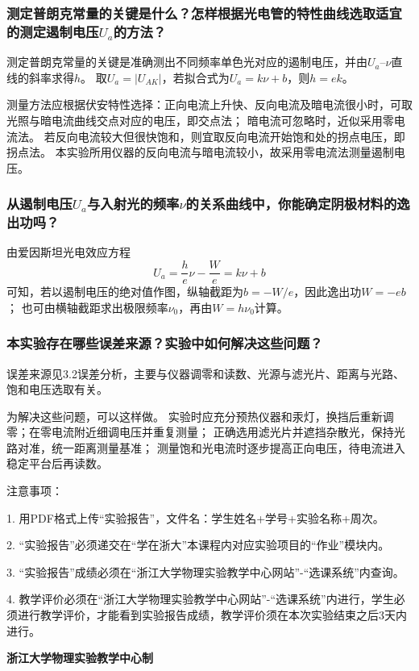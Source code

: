 \documentclass[10pt,a4paper]{ctexart} %
\begin{document}
    \subsubsection{测定普朗克常量的关键是什么？怎样根据光电管的特性曲线选取适宜的测定遏制电压\texorpdfstring{$U_a$}{Uₐ}的方法？}
    测定普朗克常量的关键是准确测出不同频率单色光对应的遏制电压，并由$U_a$--$\nu$直线的斜率求得$h$。
    取$U_a=|U_{AK}|$，若拟合式为$U_a=k\nu+b$，则$h=ek$。

    测量方法应根据伏安特性选择：正向电流上升快、反向电流及暗电流很小时，可取光照与暗电流曲线交点对应的电压，即交点法；
    暗电流可忽略时，近似采用零电流法。
    若反向电流较大但很快饱和，则宜取反向电流开始饱和处的拐点电压，即拐点法。
    本实验所用仪器的反向电流与暗电流较小，故采用零电流法测量遏制电压。

    \subsubsection{从遏制电压\texorpdfstring{$U_a$}{Uₐ}与入射光的频率\texorpdfstring{$\nu$}{ν}的关系曲线中，你能确定阴极材料的逸出功吗？}
    由爱因斯坦光电效应方程
    \[
      U_a=\frac{h}{e}\nu-\frac{W}{e}=k\nu+b
    \]
    可知，若以遏制电压的绝对值作图，纵轴截距为$b=-W/e$，因此逸出功$W=-eb$；
    也可由横轴截距求出极限频率$\nu_0$，再由$W=h\nu_0$计算。
    
    \subsubsection{本实验存在哪些误差来源？实验中如何解决这些问题？}
    误差来源见3.2误差分析，主要与仪器调零和读数、光源与滤光片、距离与光路、饱和电压选取有关。

    为解决这些问题，可以这样做。
    实验时应充分预热仪器和汞灯，换挡后重新调零；在零电流附近细调电压并重复测量；
    正确选用滤光片并遮挡杂散光，保持光路对准，统一距离测量基准；
    测量饱和光电流时逐步提高正向电压，待电流进入稳定平台后再读数。
    
\vspace*{\fill} %
\noindent
\begin{minipage}{\textwidth}
  注意事项：

  \begingroup
    \setlength{\leftskip}{2em} %
    1. 用PDF格式上传“实验报告”，文件名：学生姓名+学号+实验名称+周次。

    2. “实验报告”必须递交在“学在浙大”本课程内对应实验项目的“作业”模块内。

    3. “实验报告”成绩必须在“浙江大学物理实验教学中心网站”-“选课系统”内查询。

    4. 教学评价必须在“浙江大学物理实验教学中心网站”-“选课系统”内进行，学生必须进行教学评价，才能看到实验报告成绩，教学评价须在本次实验结束之后3天内进行。\par
  \endgroup

  \begin{center}
    {\bfseries 浙江大学物理实验教学中心制}
  \end{center}
\end{minipage}
\end{document}
